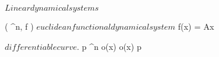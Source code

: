 \documentclass[../Main/main]{subfiles}
\begin{document}
\unit{ $ Linear dynamical systems $ }
{
	
	{
		{
			( \R^n, f ) $ euclidean functional dynamical system $
		}
		{
			{
				{
					f(x) = Ax
				}
			}
		}
	}

	{
		{
			\gamma $ differentiable curve $.
			p \in \R^n
		}
		{
			{
				o(x) \subset \gamma*
			}
		}
		{
			{
				o(x) \convergesto p
			}
		}
	}

}
\end{document}
